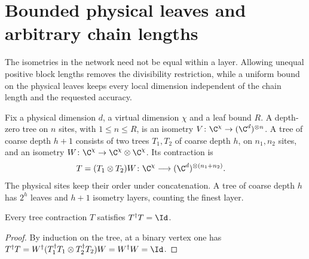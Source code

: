 \section{Bounded physical leaves and arbitrary chain lengths}
\label{sec:ldp_unequal_mera}

The isometries in the network need not be equal within a layer.
Allowing unequal positive block lengths removes the divisibility restriction,
while a uniform bound on the physical leaves keeps every local dimension
independent of the chain length and the requested accuracy.

\begin{definition}
    \label{def:ldp_bounded_isometry_tree}
    \leanok
    Fix a physical dimension $d$, a virtual dimension $\chi$ and a leaf
    bound $R$. A depth-zero tree on $n$ sites, with $1\le n\le R$, is
    an isometry $V\colon\C^\chi\to(\C^d)^{\otimes n}$.
    A tree of coarse depth $h+1$ consists of two trees $T_1,T_2$ of
    coarse depth $h$, on $n_1,n_2$ sites, and an isometry
    $W\colon\C^\chi\to\C^\chi\otimes\C^\chi$.
    Its contraction is
    \begin{align}
        T & =(T_1\otimes T_2)W
        \colon\C^\chi\longrightarrow(\C^d)^{\otimes(n_1+n_2)}.
        \label{eq:ldp_unequal_tree_contraction}
    \end{align}
    The physical sites keep their order under concatenation.
    A tree of coarse depth $h$ has $2^h$ leaves and $h+1$ isometry
    layers, counting the finest layer.
\end{definition}

\begin{lemma}
    \label{thm:ldp_bounded_tree_isometry}
    \leanok
    Every tree contraction $T$ satisfies $T^\dagger T=\Id$.
\end{lemma}
\begin{proof}
    \leanok
    By induction on the tree, at a binary vertex one has
    $T^\dagger T=W^\dagger(T_1^\dagger T_1\otimes T_2^\dagger T_2)W
        =W^\dagger W=\Id$.
\end{proof}

